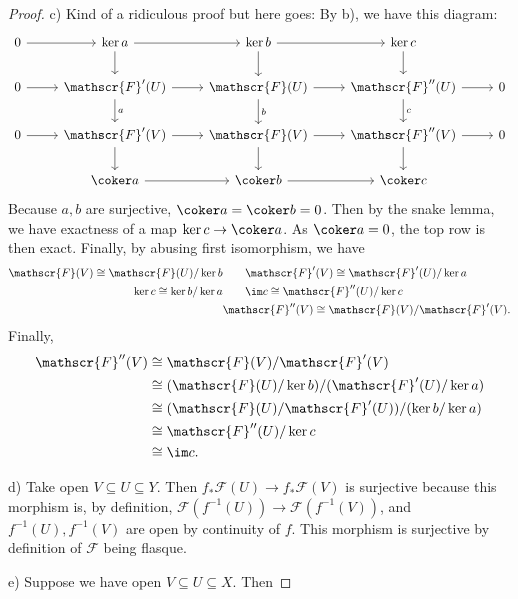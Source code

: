 \begin{proof}
	c) Kind of a ridiculous proof but here goes:
	By b), we have this diagram:
	\[\begin{tikzcd}
	0 & {\ker a} & {\ker b} & {\ker c} \\
	0 & {\mathscr{F}'(U)} & {\mathscr{F}(U)} & {\mathscr{F}''(U)} & 0 \\
	0 & {\mathscr{F}'(V)} & {\mathscr{F}(V)} & {\mathscr{F}''(V)} & 0 \\
	& {\coker a} & {\coker b} & {\coker c}
	\arrow[from=1-1, to=1-2]
	\arrow[from=1-2, to=1-3]
	\arrow[from=1-2, to=2-2]
	\arrow[from=1-3, to=1-4]
	\arrow[from=1-3, to=2-3]
	\arrow[from=1-4, to=2-4]
	\arrow[from=2-1, to=2-2]
	\arrow[from=2-2, to=2-3]
	\arrow["a", from=2-2, to=3-2]
	\arrow[from=2-3, to=2-4]
	\arrow["b", from=2-3, to=3-3]
	\arrow[from=2-4, to=2-5]
	\arrow["c", from=2-4, to=3-4]
	\arrow[from=3-1, to=3-2]
	\arrow[from=3-2, to=3-3]
	\arrow[from=3-2, to=4-2]
	\arrow[from=3-3, to=3-4]
	\arrow[from=3-3, to=4-3]
	\arrow[from=3-4, to=3-5]
	\arrow[from=3-4, to=4-4]
	\arrow[from=4-2, to=4-3]
	\arrow[from=4-3, to=4-4]
\end{tikzcd}\]
	Because $a,b $ are surjective, $\coker a = \coker b = 0 $.
	Then by the snake lemma, we have exactness of a map $\ker c \to \coker a $.
	As $\coker a = 0 $, the top row is then exact.
	Finally, by abusing first isomorphism, we have
	\begin{align*}
		\mathscr{F}(V) \cong \mathscr{F}(U) / \ker b &\qquad \mathscr{F}'(V) \cong \mathscr{F}'(U) / \ker a \\
		\ker c \cong \ker b / \ker a &\qquad \im c \cong \mathscr{F}''(U) / \ker c\\
					     & \mathscr{F}''(V) \cong \mathscr{F}(V) / \mathscr{F}'(V)
	.\end{align*} 
	Finally,
	\begin{align*}
		\mathscr{F}''(V) &\cong \mathscr{F}(V) / \mathscr{F}'(V) \\&\cong (\mathscr{F}(U) / \ker b) / (\mathscr{F}'(U) / \ker a) \\&\cong (\mathscr{F}(U) / \mathscr{F}'(U)) / (\ker b / \ker a) \\&\cong \mathscr{F}''(U) / \ker c \\&\cong \im c
	.\end{align*} 

	d) Take open $V \subseteq U \subseteq Y$.
	Then $f_\ast \mathscr{F}(U) \to f_\ast \mathscr{F}(V) $ is surjective because this morphism is, by definition, $\mathscr{F}(f^{-1}(U)) \to \mathscr{F}(f^{-1}(V)) $, and $f^{-1}(U),f^{-1}(V) $ are open by continuity of $f $.
	This morphism is surjective by definition of $\mathscr{F} $ being flasque.

	e) Suppose we have open $V \subseteq U \subseteq X $.
	Then
\end{proof}

